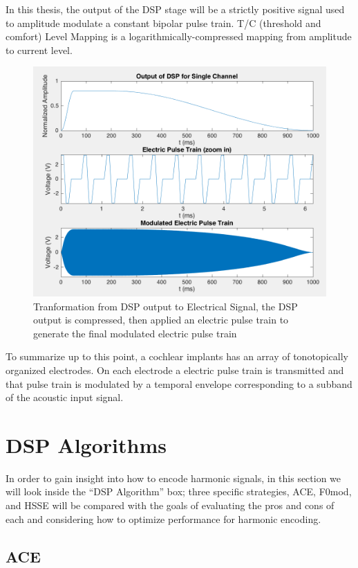 \documentclass [11pt, proquest,oneside] {ganter_thesis}[2015/03/03]
\begin{document}
In this thesis, the output of the DSP stage will be a strictly positive signal used to amplitude modulate a constant bipolar pulse train.  T/C (threshold and comfort) Level Mapping is a logarithmically-compressed mapping from amplitude to current level.

\begin{figure}[!ht]
  \centering
    \includegraphics[width=1.0\textwidth]{output_of_dsp}   
    \caption{Tranformation from DSP output to Electrical Signal, the DSP output is compressed, then applied an electric pulse train to generate the final modulated electric pulse train}\label{fig:output_of_dsp}
\end{figure}

To summarize up to this point, a cochlear implants has an array of tonotopically organized electrodes.  On each electrode a electric pulse train is transmitted and that pulse train is modulated by a temporal envelope corresponding to a subband of the acoustic input signal.

\section{DSP Algorithms}

In order to gain insight into how to encode harmonic signals, in this section we will look inside the ``DSP Algorithm'' box; three specific strategies, ACE, F0mod, and HSSE will be compared with the goals of evaluating the pros and cons of each and considering how to optimize performance for harmonic encoding.

\subsection{ACE}\label{ss:ACE}
\end{document}
